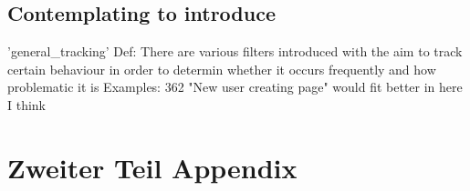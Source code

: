 \subsection{Contemplating to introduce}

'general\_tracking'
  Def: There are various filters introduced with the aim to track certain behaviour in order to determin whether it occurs frequently and how problematic it is
  Examples: 362 "New user creating page" would fit better in here I think


\section{Zweiter Teil Appendix}
\label{app:second_appendix}

